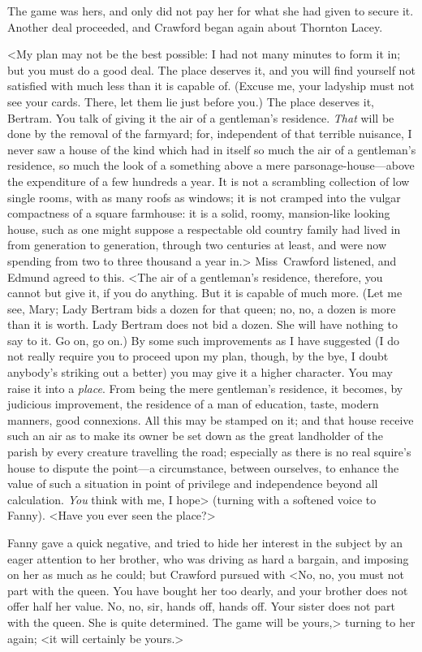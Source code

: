 The game was hers, and only did not pay her for what she had given to secure it. Another deal proceeded, and Crawford began again about Thornton Lacey.

<My plan may not be the best possible: I had not many minutes to form it in; but you must do a good deal. The place deserves it, and you will find yourself not satisfied with much less than it is capable of. (Excuse me, your ladyship must not see your cards. There, let them lie just before you.) The place deserves it, Bertram. You talk of giving it the air of a gentleman's residence. \textit{That}  will be done by the removal of the farmyard; for, independent of that terrible nuisance, I never saw a house of the kind which had in itself so much the air of a gentleman's residence, so much the look of a something above a mere parsonage-house—above the expenditure of a few hundreds a year. It is not a scrambling collection of low single rooms, with as many roofs as windows; it is not cramped into the vulgar compactness of a square farmhouse: it is a solid, roomy, mansion-like looking house, such as one might suppose a respectable old country family had lived in from generation to generation, through two centuries at least, and were now spending from two to three thousand a year in.> Miss~Crawford listened, and Edmund agreed to this. <The air of a gentleman's residence, therefore, you cannot but give it, if you do anything. But it is capable of much more. (Let me see, Mary; Lady Bertram bids a dozen for that queen; no, no, a dozen is more than it is worth. Lady Bertram does not bid a dozen. She will have nothing to say to it. Go on, go on.) By some such improvements as I have suggested (I do not really require you to proceed upon my plan, though, by the bye, I doubt anybody's striking out a better) you may give it a higher character. You may raise it into a \textit{place}. From being the mere gentleman's residence, it becomes, by judicious improvement, the residence of a man of education, taste, modern manners, good connexions. All this may be stamped on it; and that house receive such an air as to make its owner be set down as the great landholder of the parish by every creature travelling the road; especially as there is no real squire's house to dispute the point—a circumstance, between ourselves, to enhance the value of such a situation in point of privilege and independence beyond all calculation. \textit{You}  think with me, I hope> (turning with a softened voice to Fanny). <Have you ever seen the place?>

Fanny gave a quick negative, and tried to hide her interest in the subject by an eager attention to her brother, who was driving as hard a bargain, and imposing on her as much as he could; but Crawford pursued with <No, no, you must not part with the queen. You have bought her too dearly, and your brother does not offer half her value. No, no, sir, hands off, hands off. Your sister does not part with the queen. She is quite determined. The game will be yours,> turning to her again; <it will certainly be yours.>

